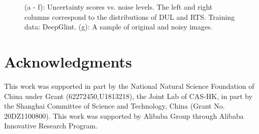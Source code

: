 \documentclass[letterpaper]{article} %
\begin{document}
\begin{figure}
  \hspace{10mm}
  \caption{(a - f): Uncertainty scores vs. noise levels. The left and right columns correspond to the distributions of DUL and RTS. Training data: DeepGlint. (g): A sample of original and noisy images.}
\label{a:fig:noise_levels}
\end{figure}

\section*{Acknowledgments}
This work was supported in part by the National Natural Science Foundation of China under Grant (62272450,U1813218), the Joint Lab of CAS-HK,  in part by  the Shanghai Committee of Science and Technology, China (Grant No. 20DZ1100800).
%
This work was supported by Alibaba Group through Alibaba Innovative Research Program.


\end{document}
